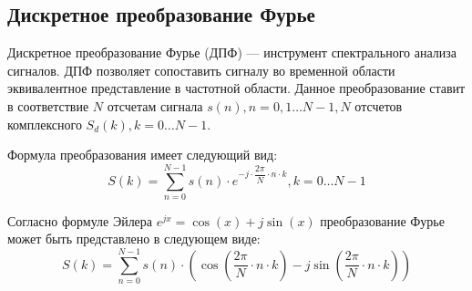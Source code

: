 \subsection{Дискретное преобразование Фурье}
Дискретное преобразование Фурье (ДПФ) --- инструмент спектрального анализа сигналов. ДПФ позволяет сопоставить сигналу во временной области эквивалентное представление в частотной области.
Данное преобразование ставит в соответствие \(N\) отсчетам сигнала \(s(n), n = 0, 1 \dots N-1,  N\) отсчетов комплексного \(S_d(k), k = 0 \dots N-1 \).

Формула преобразования имеет следующий вид:
\begin{equation}
    S(k) = \sum_{n=0}^{N-1} s(n) \cdot e^{-j \cdot \dfrac{2\pi}{N} \cdot n \cdot k}, k = 0 \dots N-1
\end{equation}

Согласно формуле Эйлера \(e^{jx} = \cos(x) + j\sin(x)\) преобразование Фурье может быть представлено в следующем виде:
\begin{equation} \label{eq:DFT_cos}
    S(k) = \sum_{n=0}^{N-1} s(n) \cdot (\cos(\dfrac{2\pi}{N} \cdot n \cdot k) - j \sin(\dfrac{2\pi}{N} \cdot n \cdot k))
\end{equation}

